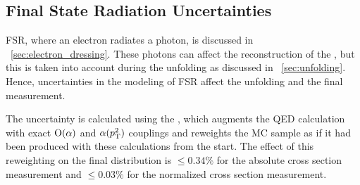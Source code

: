 \subsection{Final State Radiation Uncertainties}
\label{ssec:fsr_uncertainties}

FSR, where an electron radiates a photon, is discussed in
\SEC~\ref{sec:electron_dressing}. These photons can affect the reconstruction
of the \Z, but this is taken into account during the unfolding as discussed in
\SEC~\ref{sec:unfolding}. Hence, uncertainties in the modeling of FSR affect
the unfolding and the final measurement.

The uncertainty is calculated using the \FSRWeightProducer, which augments the
\PYTHIA QED calculation with exact $\operatorname{O}\!\left( \alpha \right)$ and $\alpha(p_{\mathrm{T}}^{2})$
couplings and reweights the MC sample as if it had been produced with these
calculations from the start. The effect of this reweighting on the final
\phistar distribution is $\le 0.34\%$ for the absolute cross section
measurement and $\le 0.03\%$ for the normalized cross section measurement.

